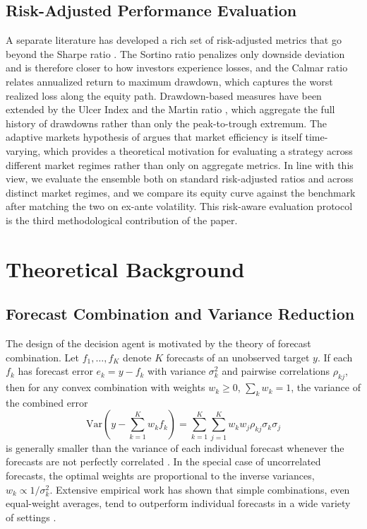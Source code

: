 \documentclass{ieeeaccess}
\begin{document}
\subsection{Risk-Adjusted Performance Evaluation}

A separate literature has developed a rich set of risk-adjusted metrics that go beyond the Sharpe ratio \cite{sharpe1966}. The Sortino ratio \cite{sortino1994} penalizes only downside deviation and is therefore closer to how investors experience losses, and the Calmar ratio \cite{young1991} relates annualized return to maximum drawdown, which captures the worst realized loss along the equity path. Drawdown-based measures have been extended by the Ulcer Index and the Martin ratio \cite{martin1989}, which aggregate the full history of drawdowns rather than only the peak-to-trough extremum. The adaptive markets hypothesis of \cite{lo2004} argues that market efficiency is itself time-varying, which provides a theoretical motivation for evaluating a strategy across different market regimes rather than only on aggregate metrics. In line with this view, we evaluate the ensemble both on standard risk-adjusted ratios and across distinct market regimes, and we compare its equity curve against the benchmark after matching the two on ex-ante volatility. This risk-aware evaluation protocol is the third methodological contribution of the paper.

\section{Theoretical Background}
\label{sec:theory}

\subsection{Forecast Combination and Variance Reduction}

The design of the decision agent is motivated by the theory of forecast combination. Let $f_1, \ldots, f_K$ denote $K$ forecasts of an unobserved target $y$. If each $f_k$ has forecast error $e_k = y - f_k$ with variance $\sigma_k^2$ and pairwise correlations $\rho_{kj}$, then for any convex combination with weights $w_k \geq 0$, $\sum_k w_k = 1$, the variance of the combined error
\begin{equation}
\mathrm{Var}\!\left( y - \sum_{k=1}^{K} w_k f_k \right)
= \sum_{k=1}^{K} \sum_{j=1}^{K} w_k w_j \rho_{kj} \sigma_k \sigma_j
\label{eq:combined_variance}
\end{equation}
is generally smaller than the variance of each individual forecast whenever the forecasts are not perfectly correlated \cite{batesgranger1969,clemen1989,timmermann2006}. In the special case of uncorrelated forecasts, the optimal weights are proportional to the inverse variances, $w_k \propto 1/\sigma_k^2$. Extensive empirical work has shown that simple combinations, even equal-weight averages, tend to outperform individual forecasts in a wide variety of settings \cite{clemen1989,timmermann2006}.
\end{document}
